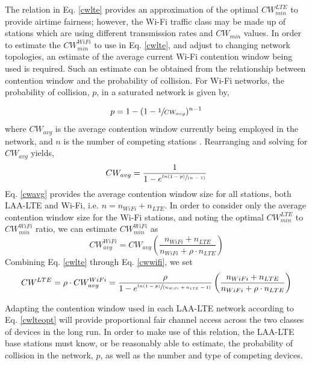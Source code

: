 The relation in Eq. \ref{cwlte} provides an approximation of the optimal $CW^{LTE}_{min}$ to provide airtime fairness; however, the \mbox{\mbox{Wi-Fi}} traffic class may be made up of stations which are using different transmission rates and $CW_{min}$ values. In order to estimate the $CW^{WiFi}_{min}$ to use in Eq. \ref{cwlte}, and adjust to changing network topologies, an estimate of the average current \mbox{Wi-Fi} contention window being used is required.  Such an estimate can be obtained from the relationship between contention window and the probability of collision. For \mbox{\mbox{Wi-Fi}} networks, the probability of collision, $p$, in a saturated network is given by, 

\begin{equation}\label{pcollision}
p = 1-(1-\sfrac{1}{CW_{avg}})^{n-1}
\end{equation}
where $CW_{avg}$ is the average contention window currently being employed in the network, and $n$ is the number of competing stations \cite{vu}.  Rearranging and solving for $CW_{avg}$ yields,
\begin{equation}\label{cwavg}
CW_{avg} = \frac{1}{1-e^{ \sfrac{ln(1-p)}{(n-1)} }}
\end{equation}
Eq. \ref{cwavg} provides the average contention window size for all stations, both \mbox{LAA-LTE} and \mbox{Wi-Fi}, i.e. $n = n_{WiFi} + n_{LTE}$.  In order to consider only the average contention window size for the \mbox{\mbox{Wi-Fi}} stations, and noting the optimal $CW^{LTE}_{min}$ to $CW^{WiFi}_{min}$ ratio, we can estimate $CW^{WiFi}_{min}$ as
\begin{equation}\label{cwwifi}
CW^{WiFi}_{avg} = CW_{avg}\left ( \frac{n_{WiFi} + n_{LTE}}{n_{WiFi} + \rho\cdot n_{LTE}} \right )
\end{equation}
Combining Eq. \ref{cwlte} through Eq. \ref{cwwifi},  we set 
\begin{equation}\label{cwlteopt}
CW^{LTE} = \rho \cdot{CW^{WiFi}_{avg}} = \frac{\rho}{1-e^{ \sfrac{ln(1-p)}{(n_{WiFi} + n_{LTE}-1)} }}\left ( \frac{n_{WiFi} + n_{LTE}}{n_{WiFi} + \rho\cdot n_{LTE}} \right )
\end{equation}

Adapting the contention window used in each \mbox{LAA-LTE} network according to Eq. \ref{cwlteopt} will provide proportional fair channel access across the two classes of devices in the long run.  In order to make use of this relation, the \mbox{LAA-LTE} base stations must know, or be reasonably able to estimate, the probability of collision in the network, $p$, as well as the number and type of competing devices.  

